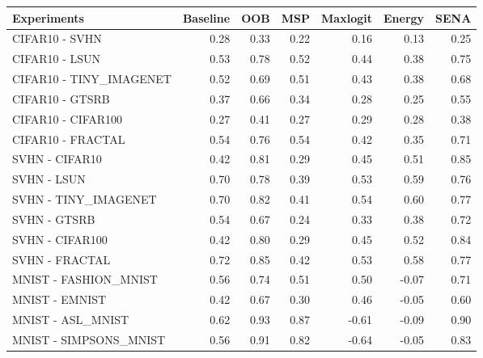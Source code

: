 \begin{tabular}{lrrrrrr}
\toprule
            Experiments &  Baseline &  OOB &  MSP &  Maxlogit &  Energy &  SENA \\
\midrule
         CIFAR10 - SVHN &      0.28 & 0.33 & 0.22 &      0.16 &    0.13 &  0.25 \\
         CIFAR10 - LSUN &      0.53 & 0.78 & 0.52 &      0.44 &    0.38 &  0.75 \\
CIFAR10 - TINY\_IMAGENET &      0.52 & 0.69 & 0.51 &      0.43 &    0.38 &  0.68 \\
        CIFAR10 - GTSRB &      0.37 & 0.66 & 0.34 &      0.28 &    0.25 &  0.55 \\
     CIFAR10 - CIFAR100 &      0.27 & 0.41 & 0.27 &      0.29 &    0.28 &  0.38 \\
      CIFAR10 - FRACTAL &      0.54 & 0.76 & 0.54 &      0.42 &    0.35 &  0.71 \\
         SVHN - CIFAR10 &      0.42 & 0.81 & 0.29 &      0.45 &    0.51 &  0.85 \\
            SVHN - LSUN &      0.70 & 0.78 & 0.39 &      0.53 &    0.59 &  0.76 \\
   SVHN - TINY\_IMAGENET &      0.70 & 0.82 & 0.41 &      0.54 &    0.60 &  0.77 \\
           SVHN - GTSRB &      0.54 & 0.67 & 0.24 &      0.33 &    0.38 &  0.72 \\
        SVHN - CIFAR100 &      0.42 & 0.80 & 0.29 &      0.45 &    0.52 &  0.84 \\
         SVHN - FRACTAL &      0.72 & 0.85 & 0.42 &      0.53 &    0.58 &  0.77 \\
  MNIST - FASHION\_MNIST &      0.56 & 0.74 & 0.51 &      0.50 &   -0.07 &  0.71 \\
         MNIST - EMNIST &      0.42 & 0.67 & 0.30 &      0.46 &   -0.05 &  0.60 \\
      MNIST - ASL\_MNIST &      0.62 & 0.93 & 0.87 &     -0.61 &   -0.09 &  0.90 \\
 MNIST - SIMPSONS\_MNIST &      0.56 & 0.91 & 0.82 &     -0.64 &   -0.05 &  0.83 \\
\bottomrule
\end{tabular}

